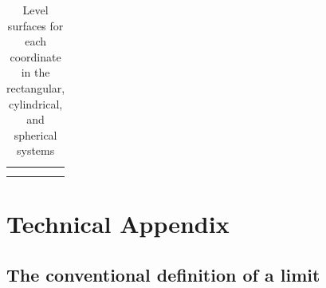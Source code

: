 \documentclass[prettycode,shellescape]{watsonbook}
\begin{document}
\vspace{12pt}

\begin{table}[h!]
  \centering
  \begin{tabular}{M{4.2cm}|M{4.2cm}|M{4.2cm}}
    \usebox{\xconstantfig} & \usebox{\yconstantfig} & \usebox{\zconstantfig}  \\ \hline
    \usebox{\rconstantfig} & \usebox{\thetaconstantfig}  & \usebox{\zconstantfig}  \\ \hline
    \usebox{\rhoconstantfig} & \usebox{\thetaconstantfig}  & \usebox{\phiconstantfig}  \\ \hline
  \end{tabular}
  \caption{Level surfaces for each coordinate
    in the rectangular, cylindrical, and spherical
    systems \label{table:coordinateslices}}
\end{table}

\newpage

\section{Technical Appendix}

\subsection{The conventional definition of a limit}
\label{sec:limitappendix}
\end{document}
